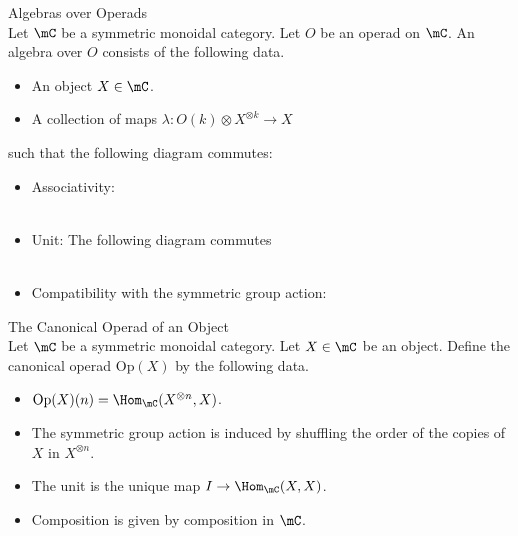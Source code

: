 \documentclass[a4paper]{article}
\begin{document}
\begin{defn}{Algebras over Operads}{}\\
Let $\mC$ be a symmetric monoidal category. Let $O$ be an operad on $\mC$. An algebra over $O$ consists of the following data. 
\begin{itemize}
\item An object $X\in\mC$. 
\item A collection of maps $\lambda:O(k)\otimes X^{\otimes k}\to X$
\end{itemize}
such that the following diagram commutes: 
\begin{itemize}
\item Associativity: \\
 \\
\item Unit: The following diagram commutes \\
 \\
\item Compatibility with the symmetric group action: 
\end{itemize}
\end{defn}

\begin{defn}{The Canonical Operad of an Object}{}\\
Let $\mC$ be a symmetric monoidal category. Let $X\in\mC$ be an object. Define the canonical operad $\text{Op}(X)$ by the following data. 
\begin{itemize}
\item $\text{Op}(X)(n)=\Hom_\mC(X^{\otimes n},X)$. 
\item The symmetric group action is induced by shuffling the order of the copies of $X$ in $X^{\otimes n}$. 
\item The unit is the unique map $I\to\Hom_\mC(X,X)$. 
\item Composition is given by composition in $\mC$. 
\end{itemize}
\end{defn}
\end{document}
